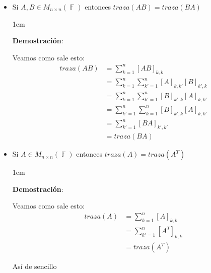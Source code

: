 \documentclass[12pt, fleqn]{article}                             %
\newenvironment{SmallIndentation}[1][0.75em]                    %
        {\begin{adjustwidth}{#1}{}\begin{footnotesize}}             %
        {\end{footnotesize}\end{adjustwidth}}                       %
\theoremstyle{break}                                            %
\DeclareMathOperator \GenericField {\mathbb{F}}                 %
\begin{document}
    \begin{itemize}

        \item
            Si $A, B \in M_{n \times n}(\GenericField)$ entonces $traza(AB) = traza(BA)$
            \begin{SmallIndentation}[1em]
                \textbf{Demostración}:
                
                Veamos como sale esto:
                \begin{align*}
                    traza(AB)
                        &= \sum_{k = 1}^n [AB]_{k, k}                                \\
                        &= \sum_{k = 1}^n \sum_{k' = 1}^n [A]_{k, k'} [B]_{k', k}    \\
                        &= \sum_{k = 1}^n \sum_{k' = 1}^n [B]_{k', k} [A]_{k, k'}    \\
                        &= \sum_{k' = 1}^n \sum_{k = 1}^n [B]_{k', k} [A]_{k, k'}    \\
                        &= \sum_{k' = 1}^n [BA]_{k', k'}                             \\
                        &= traza(BA)
                \end{align*}
            
            \end{SmallIndentation}

        \item
            Si $A \in M_{n \times n}(\GenericField)$ entonces $traza(A) = traza(A^T)$
            \begin{SmallIndentation}[1em]
                \textbf{Demostración}:
                
                Veamos como sale esto:
                \begin{align*}
                    traza(A)
                        &= \sum_{k = 1}^n [A]_{k, k}                                 \\
                        &= \sum_{k' = 1}^n [A^T]_{k, k}                              \\
                        &= traza(A^T)
                \end{align*}

                Así de sencillo

            \end{SmallIndentation}



\end{itemize}
\end{document}
